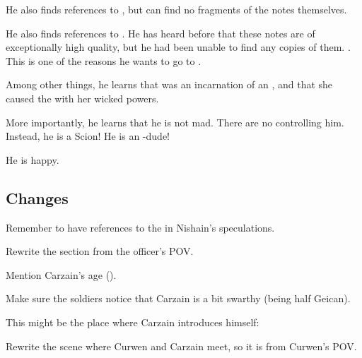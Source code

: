 \begin{garbage}
He also finds references to , but can find no fragments of the notes themselves. 

He also finds references to . 
He has heard before that these notes are of exceptionally high quality, but he had been unable to find any copies of them. 
. 
This is one of the reasons he wants to go to \Redce. 

Among other things, he learns that \Belzir{} was an incarnation of an  \malach, and that she caused the \HundredScourges{} with her wicked \malach{} powers. 

More importantly, he learns that he is not mad. 
There are no \qliphoth{} controlling him. 
Instead, he is a Scion! 
He is an \uber-dude! 

He is happy. 









\subsection{Changes}
\begin{changes}
    
  \begin{comment}
  \paragraph{War is Coming}
  \end{comment}
    Remember to have references to the \hs{\shechinah} in Nishain's speculations. 
    
    Rewrite the  section from the officer's POV. 
    
    Mention Carzain's age (). 
    
    Make sure the soldiers notice that Carzain is a bit swarthy (being half Geican). 
    
    This might be the place where Carzain introduces himself:

  \begin{comment}
  \paragraph{To Malcur}
  \end{comment}
    Rewrite the scene where Curwen and Carzain meet, so it is from Curwen's POV. 
    

\end{changes}
\end{garbage}
